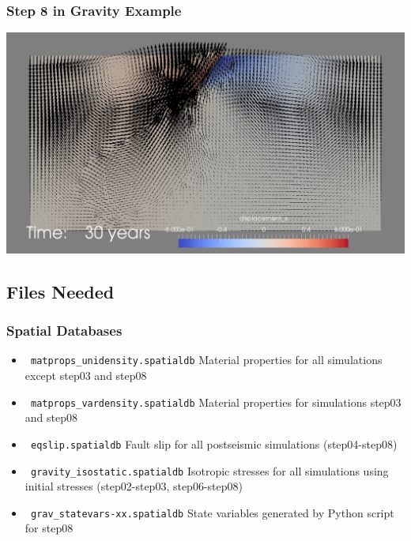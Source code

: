 \documentclass{beamer}
\begin{document}
\begin{frame}
  \frametitle{Step 8 in Gravity Example}

  \begin{center}
    \includegraphics[scale=0.3]{figs/step08}
  \end{center}
      
\end{frame}


\subsection{Files Needed}

\begin{frame}
  \frametitle{Spatial Databases}
  \summary{}

  \begin{itemize}
  \item {\tt\color{green} matprops\_unidensity.spatialdb} Material properties for
    all simulations except step03 and step08
  \item {\tt\color{green} matprops\_vardensity.spatialdb} Material properties for
    simulations step03 and step08
  \item {\tt\color{green} eqslip.spatialdb} Fault slip for all postseismic
    simulations (step04-step08)
  \item {\tt\color{green} gravity\_isostatic.spatialdb} Isotropic stresses for all
    simulations using initial stresses (step02-step03, step06-step08)
  \item {\tt\color{green} grav\_statevars-xx.spatialdb} State
    variables generated by Python script for step08
  \end{itemize}
  
\end{frame}
\end{document}
